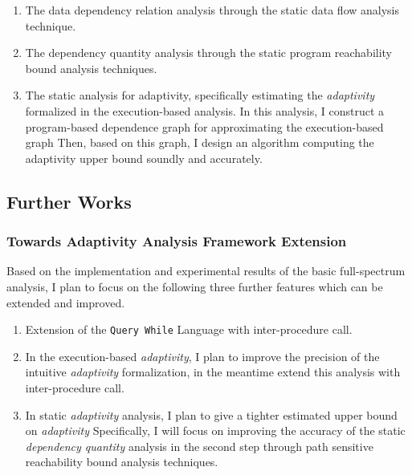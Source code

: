 \begin{enumerate}
\begin{enumerate}
\item The data dependency relation analysis through the static data flow analysis technique.
\item The dependency quantity analysis through the static program reachability bound analysis techniques.
\item 
The static analysis for adaptivity, specifically estimating the \emph{adaptivity} formalized in the execution-based analysis.
In this analysis, I construct a program-based dependence graph for approximating the execution-based graph
Then, based on this graph, I design an algorithm
computing the adaptivity upper bound soundly 
and accurately.
\end{enumerate}
\end{enumerate}%


\subsection{Further Works}
\subsubsection{Towards Adaptivity Analysis Framework Extension}
\label{subsec:intro-improve}
Based on the implementation and experimental results of the basic full-spectrum analysis,
I plan to focus on the following three further features which can be extended and improved.
\begin{enumerate}
    \item Extension of the {\tt Query While} Language with inter-procedure call.
    \item In the execution-based \emph{adaptivity},
    I plan to improve the precision of the intuitive \emph{adaptivity} formalization,
in the meantime extend this analysis with inter-procedure call.
\item In static \emph{adaptivity} analysis, I plan to give a tighter estimated upper bound on \emph{adaptivity}
Specifically, I will focus on improving the accuracy of the static \emph{dependency quantity} analysis in the second step through 
path sensitive reachability bound analysis techniques. 
\end{enumerate}
